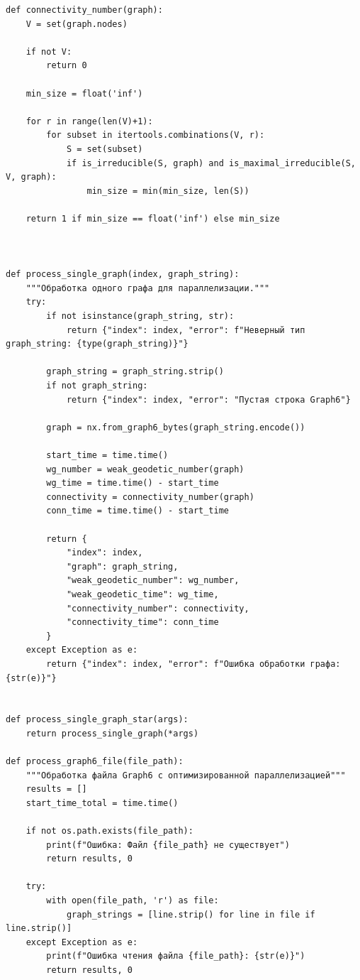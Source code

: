 \documentclass[bachelor, och, nir]{SCWorks}
\begin{document}
\begin{verbatim}
def connectivity_number(graph):
    V = set(graph.nodes)
    
    if not V:
        return 0

    min_size = float('inf')

    for r in range(len(V)+1):
        for subset in itertools.combinations(V, r):
            S = set(subset)
            if is_irreducible(S, graph) and is_maximal_irreducible(S, V, graph):
                min_size = min(min_size, len(S))

    return 1 if min_size == float('inf') else min_size



def process_single_graph(index, graph_string):
    """Обработка одного графа для параллелизации."""
    try:
        if not isinstance(graph_string, str):
            return {"index": index, "error": f"Неверный тип graph_string: {type(graph_string)}"}
        
        graph_string = graph_string.strip()
        if not graph_string:
            return {"index": index, "error": "Пустая строка Graph6"}
        
        graph = nx.from_graph6_bytes(graph_string.encode())
        
        start_time = time.time()
        wg_number = weak_geodetic_number(graph)
        wg_time = time.time() - start_time
        connectivity = connectivity_number(graph)
        conn_time = time.time() - start_time

        return {
            "index": index,
            "graph": graph_string,
            "weak_geodetic_number": wg_number,
            "weak_geodetic_time": wg_time,
            "connectivity_number": connectivity,
            "connectivity_time": conn_time
        }
    except Exception as e:
        return {"index": index, "error": f"Ошибка обработки графа: {str(e)}"}


def process_single_graph_star(args):
    return process_single_graph(*args)

def process_graph6_file(file_path):
    """Обработка файла Graph6 с оптимизированной параллелизацией"""
    results = []
    start_time_total = time.time()
    
    if not os.path.exists(file_path):
        print(f"Ошибка: Файл {file_path} не существует")
        return results, 0
    
    try:
        with open(file_path, 'r') as file:
            graph_strings = [line.strip() for line in file if line.strip()]
    except Exception as e:
        print(f"Ошибка чтения файла {file_path}: {str(e)}")
        return results, 0
    

\end{verbatim}
\end{document}
